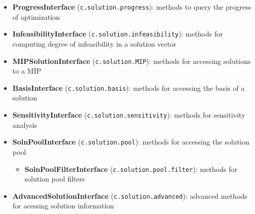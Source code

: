 \documentclass[12pt]{article}
\begin{document}
\begin{itemize}
\begin{itemize}
            \item \textbf{ProgressInterface} (\texttt{c.solution.progress}): methods to query the progress of optimization
            \item \textbf{InfeasibilityInterface} (\texttt{c.solution.infeasibility}): methods for computing degree of infeasibility in a solution vector
            \item \textbf{MIPSolutionInterface} (\texttt{c.solution.MIP}): methods for accessing solutions to a MIP
            \item \textbf{BasisInterface} (\texttt{c.solution.basis}): methods for accessing the basis of a solution
            \item \textbf{SensitivityInterface} (\texttt{c.solution.sensitivity}): methods for sensitivity analysis
            \item \textbf{SolnPoolInterface} (\texttt{c.solution.pool}): methods for accessing the solution pool
                \begin{itemize}
                    \item \textbf{SolnPoolFilterInterface} (\texttt{c.solution.pool.filter}): methods for solution pool filters
                \end{itemize}
            \item \textbf{AdvancedSolutionInterface} (\texttt{c.solution.advanced}): advanced methods for acessing solution information

\end{itemize}
\end{itemize}
\end{document}
